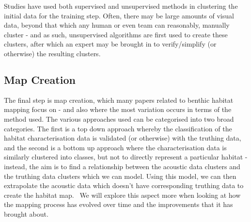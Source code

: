 \documentclass[12pt]{article}
\begin{document}
            Studies have used both supervised and unsupervised methods in clustering the initial data for the training step. Often, there may be large amounts of visual data, beyond that which any human or even team can reasonably, manually cluster - and as such, unsupervised algorithms are first used to create these clusters, after which an expert may be brought in to verify/simplify (or otherwise) the resulting clusters.~\citep*{steinberg11} 

            \subsection{Map Creation}
            The final step is map creation, which many papers related to benthic habitat mapping focus on - and also where the most variation occurs in terms of the method used. The various approaches used can be categorised into two broad categories. The first is a top down approach whereby the classification of the habitat characterisation data is validated (or otherwise) with the truthing data, and the second is a bottom up approach where the characterisation data is similarly clustered into classes, but not to directly represent a particular habitat - instead, the aim is to find a relationship between the acoustic data clusters and the truthing data clusters which we can model. Using this model, we can then extrapolate the acoustic data which doesn't have corresponding truthing data to create the habitat map.~\citep{ahsan11} We will explore this aspect more when looking at how the mapping process has evolved over time and the improvements that it has brought about.

\end{document}

